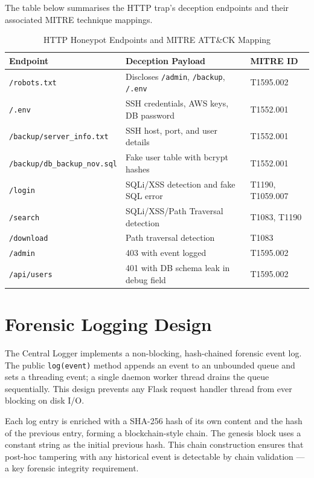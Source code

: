 The table below summarises the \ac{HTTP} trap's deception endpoints and their associated MITRE technique mappings.

\begin{table}[h!]
    \centering
    \caption{HTTP Honeypot Endpoints and MITRE ATT\&CK Mapping}
    \renewcommand{\arraystretch}{1.3}
    \begin{tabular}{|l|l|l|}
        \hline
        \textbf{Endpoint} & \textbf{Deception Payload} & \textbf{MITRE ID} \\
        \hline
        \texttt{/robots.txt} & Discloses \texttt{/admin}, \texttt{/backup}, \texttt{/.env} & T1595.002 \\
        \texttt{/.env} & SSH credentials, AWS keys, DB password & T1552.001 \\
        \texttt{/backup/server\_info.txt} & SSH host, port, and user details & T1552.001 \\
        \texttt{/backup/db\_backup\_nov.sql} & Fake user table with bcrypt hashes & T1552.001 \\
        \texttt{/login} & SQLi/XSS detection and fake SQL error & T1190, T1059.007 \\
        \texttt{/search} & SQLi/XSS/Path Traversal detection & T1083, T1190 \\
        \texttt{/download} & Path traversal detection & T1083 \\
        \texttt{/admin} & 403 with event logged & T1595.002 \\
        \texttt{/api/users} & 401 with DB schema leak in debug field & T1595.002 \\
        \hline
    \end{tabular}
\end{table}

\section{Forensic Logging Design}

The Central Logger implements a non-blocking, hash-chained forensic event log. The public \texttt{log(event)} method appends an event to an unbounded queue and sets a threading event; a single daemon worker thread drains the queue sequentially. This design prevents any Flask request handler thread from ever blocking on disk I/O.

Each log entry is enriched with a SHA-256 hash of its own content and the hash of the previous entry, forming a blockchain-style chain. The genesis block uses a constant string as the initial previous hash. This chain construction ensures that post-hoc tampering with any historical event is detectable by chain validation — a key forensic integrity requirement.

